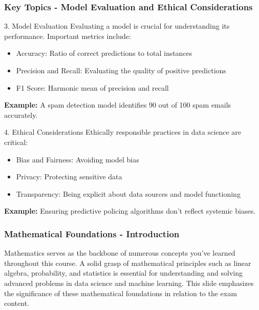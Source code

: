 \documentclass[aspectratio=169]{beamer}
\begin{document}
\begin{frame}[fragile]
    \frametitle{Key Topics - Model Evaluation and Ethical Considerations}
    \begin{block}{3. Model Evaluation}
        Evaluating a model is crucial for understanding its performance. Important metrics include:
        \begin{itemize}
            \item Accuracy: Ratio of correct predictions to total instances
            \item Precision and Recall: Evaluating the quality of positive predictions
            \item F1 Score: Harmonic mean of precision and recall
        \end{itemize}
        \textbf{Example:} A spam detection model identifies 90 out of 100 spam emails accurately.
    \end{block}

    \begin{block}{4. Ethical Considerations}
        Ethically responsible practices in data science are critical:
        \begin{itemize}
            \item Bias and Fairness: Avoiding model bias
            \item Privacy: Protecting sensitive data
            \item Transparency: Being explicit about data sources and model functioning
        \end{itemize}
        \textbf{Example:} Ensuring predictive policing algorithms don't reflect systemic biases.
    \end{block}
\end{frame}

\begin{frame}[fragile]
    \frametitle{Mathematical Foundations - Introduction}
    Mathematics serves as the backbone of numerous concepts you've learned throughout this course.  
    A solid grasp of mathematical principles such as linear algebra, probability, and statistics is essential for understanding and solving advanced problems in data science and machine learning.  
    This slide emphasizes the significance of these mathematical foundations in relation to the exam content.
\end{frame}
\end{document}
